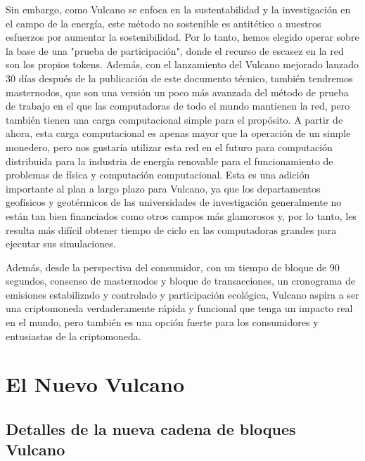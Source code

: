 \documentclass[A4paper, 12pt]{article}
\begin{document}
Sin embargo, como Vulcano se enfoca en la sustentabilidad y la investigación en el campo de la energía, este método no sostenible es antitético a nuestros esfuerzos por aumentar la sostenibilidad.   Por lo tanto, hemos elegido operar sobre la base de una "prueba de participación", donde el recurso de escasez en la red son los propios tokens.  Además, con el lanzamiento del Vulcano mejorado lanzado 30 días después de la publicación de este documento técnico, también tendremos masternodos, que son una versión un poco más avanzada del método de prueba de trabajo en el que las computadoras de todo el mundo mantienen la red, pero también tienen una carga computacional simple para el propósito. A partir de ahora, esta carga computacional es apenas mayor que la operación de un simple monedero, pero nos gustaría utilizar esta red en el futuro para computación distribuida para la industria de energía renovable para el funcionamiento de problemas de física y computación computacional. Esta es una adición importante al plan a largo plazo para Vulcano, ya que los departamentos geofísicos y geotérmicos de las universidades de investigación generalmente no están tan bien financiados como otros campos más glamorosos y, por lo tanto, les resulta más difícil obtener tiempo de ciclo en las computadoras grandes para ejecutar sus simulaciones.

Además, desde la perspectiva del consumidor, con un tiempo de bloque de 90 segundos, consenso de masternodos y bloque de transacciones, un cronograma de emisiones estabilizado y controlado y participación ecológica, Vulcano aspira a ser una criptomoneda verdaderamente rápida y funcional que tenga un impacto real en el mundo, pero también es una opción fuerte para los consumidores y entusiastas de la criptomoneda.

\section{El Nuevo Vulcano}
\subsection{Detalles de la nueva cadena de bloques Vulcano}
\end{document}
